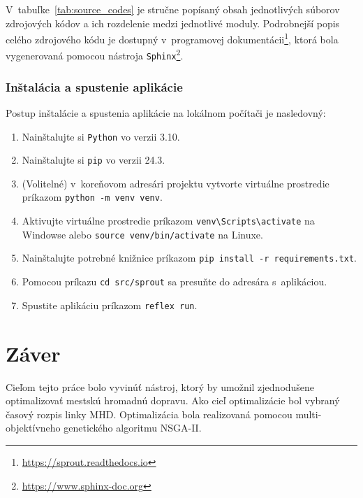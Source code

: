 V~tabuľke~\ref{tab:source_codes} je stručne popísaný obsah jednotlivých súborov zdrojových kódov a ich rozdelenie medzi jednotlivé moduly.
Podrobnejší popis celého zdrojového kódu je dostupný v~programovej dokumentácii\footnote{\url{https://sprout.readthedocs.io}}, ktorá bola vygenerovaná pomocou nástroja \texttt{Sphinx}\footnote{\url{https://www.sphinx-doc.org}}.

\subsection*{Inštalácia a spustenie aplikácie}
Postup inštalácie a spustenia aplikácie na lokálnom počítači je nasledovný:
\begin{enumerate}
  \item Nainštalujte si \texttt{Python} vo verzii 3.10.
  \item Nainštalujte si \texttt{pip} vo verzii 24.3.
  \item (Volitelné) v~koreňovom adresári projektu vytvorte virtuálne prostredie príkazom \texttt{python -m venv venv}.
  \item Aktivujte virtuálne prostredie príkazom \texttt{venv\textbackslash Scripts\textbackslash activate} na Windowse alebo \texttt{source venv/bin/activate} na Linuxe.
  \item Nainštalujte potrebné knižnice príkazom \texttt{pip install -r requirements.txt}.
  \item Pomocou príkazu \texttt{cd src/sprout} sa presuňte do adresára s~aplikáciou.
  \item Spustite aplikáciu príkazom \texttt{reflex run}.
\end{enumerate}

\chapter{Záver}\label{zaver}

Cieľom tejto práce bolo vyvinúť nástroj, ktorý by umožnil zjednodušene optimalizovať mestskú hromadnú dopravu.
Ako cieľ optimalizácie bol vybraný časový rozpis linky MHD.
Optimalizácia bola realizovaná pomocou multi-objektívneho genetického algoritmu NSGA-II.

